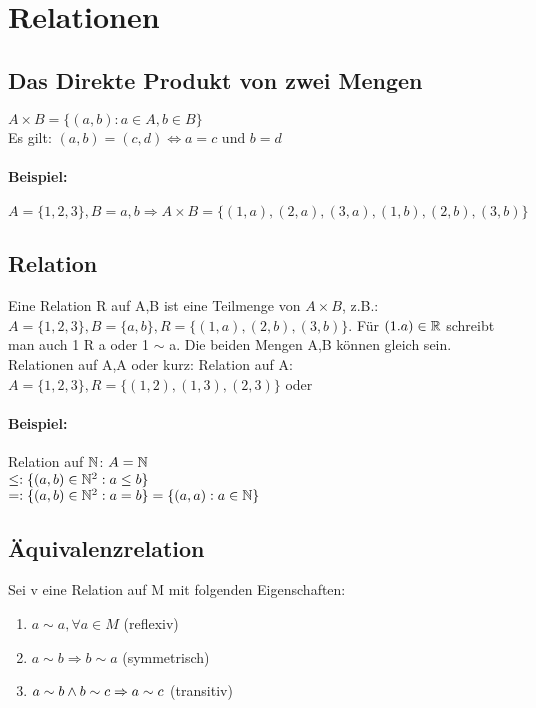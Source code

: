 \section{Relationen}

\subsection{Das Direkte Produkt von zwei Mengen}
$A\times B=\{(a,b):a\in A,b\in B\}$\\
Es gilt: $(a,b)=(c,d) \Leftrightarrow a=c \textrm{ und } b=d$\\
\paragraph{Beispiel:} $A=\{1,2,3\}, B={a,b} \Rightarrow A\times B=\{(1,a),(2,a),(3,a),(1,b),(2,b),(3,b)\}$

\subsection{Relation}
Eine Relation R auf A,B ist eine Teilmenge von $A\times B$, z.B.: $A=\{1,2,3\}, B=\{a,b\}, R=\{(1,a),(2,b),(3,b)\}$. Für $(1.a)\in \mathbb{R}$ schreibt man auch 1 R a oder 1 $\sim$ a. Die beiden Mengen A,B können gleich sein. Relationen auf A,A oder kurz: Relation auf A: $A=\{1,2,3\}, R=\{(1,2),(1,3),(2,3)\}$ oder 

\paragraph{Beispiel:}Relation auf $\mathbb{N}$: $A=\mathbb{N}$\\
$\leq:\{(a,b)\in \mathbb{N}^2:a\leq b\}$\\
$=:\{(a,b)\in \mathbb{N}^2:a=b\}=\{(a,a):a\in \mathbb{N} \}$\\

\subsection{Äquivalenzrelation}
Sei v eine Relation auf M mit folgenden Eigenschaften: 
\begin{enumerate}
\item $a\sim a, \forall a\in M$ (reflexiv)
\item $a\sim b \Rightarrow b\sim a$ (symmetrisch)
\item $a\sim b \wedge b\sim c \Rightarrow a\sim c$ (transitiv)
\end{enumerate}

